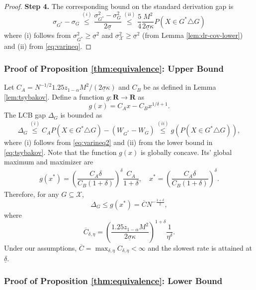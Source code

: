 \documentclass[12pt]{article}
\numberwithin{equation}{section}
\theoremstyle{plain}                         %
\theoremstyle{definition}                  %
\theoremstyle{remark}                      %
\begin{document}
\begin{proof}
\textbf{Step 4.} The corresponding bound on the standard derivation gap is
$$
\sigma_{G^{*}} - \sigma_G \overset{(i)}{\leq} \dfrac{ \sigma^2_{G^{*}} - \sigma^2_G}{2 \underline{\sigma}} \overset{(ii)}{\leq} \frac{5}{4}\frac{M^2}{2\underline{\sigma}\kappa} P (X \in G^{*}  \triangle  G)
$$
where (i) follows from $\sigma^2_{G^{*}} \geq \underline{\sigma}^2$ and $\sigma^2_{\mathcal{X}} \geq \underline{\sigma}^2$ (from Lemma \ref{lem:dr-cov-lower}) and (ii) from \eqref{eq:varineq}.
\end{proof}



\subsubsection{Proof of Proposition \ref{thm:equivalence}: Upper Bound}

Let $C_A= N^{-1/2} 1.25 z_{1-\alpha}M^2/(2 \underline{\sigma} \kappa)$ and $C_B$ be as defined in Lemma \ref{lem:tsybakov}. Define a function $g: \mathbf{R} \to \mathbf{R}$ as
\begin{equation}
\label{eq:maing}
g(x)=C_A x - C_B x^{1/\delta+1}.
\end{equation}
The LCB gap $\Delta_G$  is bounded as
$$
\Delta_G \overset{(i)}{\leq} C_A P (X \in G^{*}  \triangle  G)  - (W_{G^{*}} - W_G)  \overset{(ii)}{\leq}   g(P (X \in G^{*}  \triangle  G)),
$$
where (i) follows from \eqref{eq:varineq2} and (ii) from the lower bound in \eqref{eq:tsybakov}. Note that the function $g(x)$ is globally concave. Its' global maximum and maximizer are
\begin{align*}
g(x^{*}) =\left(\dfrac{C_A \delta }{C_B (1+\delta)}\right)^{\delta} \dfrac{C_A}{1+\delta}, \quad x^{*} = \left(\dfrac{C_A \delta }{C_B (1+\delta)}\right)^{\delta}.
\end{align*}
Therefore, for any $G \subseteq \mathcal{X}$,
\[
\Delta_{G} \leq g(x^*) = \overline{C} N^{-\frac{1 + \delta}{2}},
\]
where
 \[
  \overline{C}_{\delta, \eta} = \left( \frac{1.25 z_{1-\alpha} M^2}{2 \underline{\sigma} \kappa}\right)^{1 + \delta}  \frac{1}{\eta^{\delta}}.
 \]
 Under our assumptions, $\overline{C} = \max_{\delta, \eta}C_{\delta, \eta} < \infty$ and the slowest rate is attained at $\underline{\delta}.$



\subsubsection{Proof of Proposition \ref{thm:equivalence}: Lower Bound}
\end{document}
